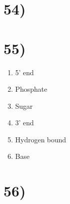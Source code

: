 \section*{54)}


\section*{55)}
\begin{enumerate}
    \item 5' end
    \item Phosphate
    \item Sugar
    \item 3' end
    \item Hydrogen bound
    \item Base
\end{enumerate}

\section*{56)}


